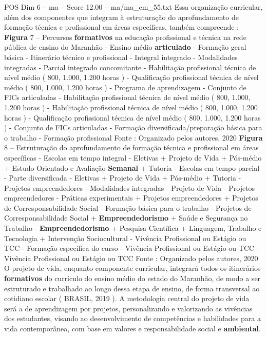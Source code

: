 \begin{textsample}{POS Dim 6 – ma – Score 12.00 – ma/ma\_em\_55.txt}
Essa organização curricular, além dos componentes que integram à estruturação do aprofundamento de formação técnica e profissional em áreas específicas, também compreende : \textbf{Figura} 7 – Percursos \textbf{formativos} na educação profissional e técnica na rede pública de ensino do Maranhão - Ensino médio \textbf{articulado} - Formação geral básica - Itinerário técnico e profissional - Integral integrado - Modalidades integradas - Parcial integrado concomitante - Habilitação profissional técnica de nível médio ( 800, 1.000, 1.200 horas ) - Qualificação profissional técnica de nível médio ( 800, 1.000, 1.200 horas ) - Programa de aprendizagem - Conjunto de FICs articuladas - Habilitação profissional técnica de nível médio ( 800, 1.000, 1.200 horas ) - Habilitação profissional técnica de nível médio ( 800, 1.000, 1.200 horas ) - Qualificação profissional técnica de nível médio ( 800, 1.000, 1.200 horas ) - Conjunto de FICs articuladas - Formação diversificada/preparação básica para o trabalho - Formação profissional Fonte : Organizado pelos autores, 2020 \textbf{Figura} 8 – Estruturação do aprofundamento de formação técnica e profissional em áreas específicas - Escolas em tempo integral - Eletivas + Projeto de Vida + Pós-médio + Estudo Orientado e Avaliação \textbf{Semanal} + Tutoria - Escolas em tempo parcial - Parte diversificada - Eletivas + Projeto de Vida + Pós-médio + Tutoria - Projetos empreendedores - Modalidades integradas - Projeto de Vida - Projetos empreendedores - Práticas experimentais + Projetos empreendedores + Projetos de Corresponsabilidade Social - Formação básica para o trabalho - Projetos de Corresponsabilidade Social + \textbf{Empreendedorismo} + Saúde e Segurança no Trabalho - \textbf{Empreendedorismo} + Pesquisa Científica + Linguagem, Trabalho e Tecnologia + Intervenção Sociocultural - Vivência Profissional ou Estágio ou TCC - Formação específica do curso - Vivência Profissional ou Estágio ou TCC - Vivência Profissional ou Estágio ou TCC Fonte : Organizado pelos autores, 2020 O projeto de vida, enquanto componente curricular, integrará todos os itinerários \textbf{formativos} do currículo do ensino médio do estado do Maranhão, de modo a ser estruturado e trabalhado ao longo dessa etapa de ensino, de forma transversal ao cotidiano escolar ( BRASIL, 2019 ).
A metodologia central do projeto de vida será a de aprendizagem por projetos, personalizando e valorizando as vivências dos estudantes, visando ao desenvolvimento de competências e habilidades para a vida contemporânea, com base em valores e responsabilidade social e \textbf{ambiental}.

\end{textsample}
